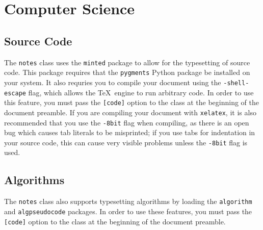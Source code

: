 \documentclass[diagram]{notes}
\begin{document}
\section{Computer Science}
\subsection{Source Code}
The \texttt{notes} class uses the \texttt{minted} package to allow for the typesetting of source code. This package requires that the \texttt{pygments} Python package be installed on your system. It also requries you to compile your document using the \verb|-shell-escape| flag, which allows the \TeX~engine to run arbitrary code. In order to use this feature, you must pass the \verb|[code]| option to the class at the beginning of the document preamble. If you are compiling your document with \texttt{xelatex}, it is also recommended that you use the \verb|-8bit| flag when compiling, as there is an open bug which causes tab literals to be misprinted; if you use tabs for indentation in your source code, this can cause very visible problems unless the \verb|-8bit| flag is used.

\subsection{Algorithms}
The \texttt{notes} class also supports typesetting algorithms by loading the \verb|algorithm| and \verb|algpseudocode| packages. In order to use these features, you must pass the \verb|[code]| option to the class at the beginning of the document preamble.
\end{document}
